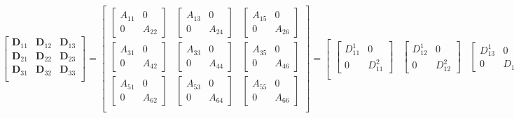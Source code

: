 \documentclass[letterpaper, 10pt, twoside]{article}
\begin{document}
	\[
	\begin{bmatrix}
	\mathbf{D}_{11} & \mathbf{D}_{12} & \mathbf{D}_{13}  \\
	\mathbf{D}_{21} & \mathbf{D}_{22} & \mathbf{D}_{23}  \\
	\mathbf{D}_{31} & \mathbf{D}_{32} & \mathbf{D}_{33}  \\
	\end{bmatrix} 
	=
	\begin{bmatrix}
	\begin{bmatrix}
	A_{11} & 0 \\
	0 & A_{22} 
	\end{bmatrix} &
	\begin{bmatrix}
	A_{13} & 0 \\
	0 & A_{24} 
	\end{bmatrix} &
	\begin{bmatrix}
	A_{15} & 0 \\
	0 & A_{26} 
	\end{bmatrix} \\
	
	\begin{bmatrix}
	A_{31} & 0 \\
	0 & A_{42} 
	\end{bmatrix} &
	\begin{bmatrix}
	A_{33} & 0 \\
	0 & A_{44} 
	\end{bmatrix} &
	\begin{bmatrix}
	A_{35} & 0 \\
	0 & A_{46} 
	\end{bmatrix} \\
	
	\begin{bmatrix}
	A_{51} & 0 \\
	0 & A_{62} 
	\end{bmatrix} &
	\begin{bmatrix}
	A_{53} & 0 \\
	0 & A_{64} 
	\end{bmatrix} &
	\begin{bmatrix}
	A_{55} & 0 \\
	0 & A_{66} 
	\end{bmatrix} \\
	\end{bmatrix} 
	=
	\begin{bmatrix}
	\begin{bmatrix}
	D_{11}^1 & 0\\
	0 & D_{11}^2
	\end{bmatrix} &
	\begin{bmatrix}
	D_{12}^1 & 0 \\
	0 & D_{12}^2 
	\end{bmatrix} &
	\begin{bmatrix}
	D_{13}^1& 0 \\
	0 & D_{13} 
	\end{bmatrix} \\
	

\end{bmatrix}\]
\end{document}
